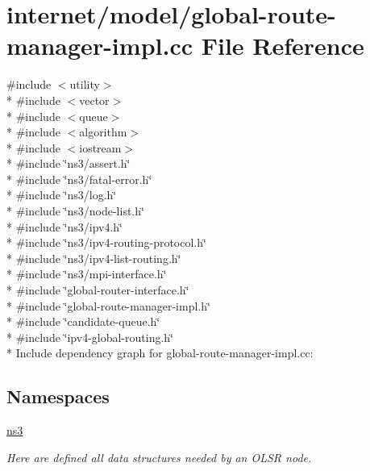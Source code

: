 \hypertarget{global-route-manager-impl_8cc}{}\section{internet/model/global-\/route-\/manager-\/impl.cc File Reference}
\label{global-route-manager-impl_8cc}
{\ttfamily \#include $<$utility$>$}\\*
{\ttfamily \#include $<$vector$>$}\\*
{\ttfamily \#include $<$queue$>$}\\*
{\ttfamily \#include $<$algorithm$>$}\\*
{\ttfamily \#include $<$iostream$>$}\\*
{\ttfamily \#include \char`\"{}ns3/assert.\+h\char`\"{}}\\*
{\ttfamily \#include \char`\"{}ns3/fatal-\/error.\+h\char`\"{}}\\*
{\ttfamily \#include \char`\"{}ns3/log.\+h\char`\"{}}\\*
{\ttfamily \#include \char`\"{}ns3/node-\/list.\+h\char`\"{}}\\*
{\ttfamily \#include \char`\"{}ns3/ipv4.\+h\char`\"{}}\\*
{\ttfamily \#include \char`\"{}ns3/ipv4-\/routing-\/protocol.\+h\char`\"{}}\\*
{\ttfamily \#include \char`\"{}ns3/ipv4-\/list-\/routing.\+h\char`\"{}}\\*
{\ttfamily \#include \char`\"{}ns3/mpi-\/interface.\+h\char`\"{}}\\*
{\ttfamily \#include \char`\"{}global-\/router-\/interface.\+h\char`\"{}}\\*
{\ttfamily \#include \char`\"{}global-\/route-\/manager-\/impl.\+h\char`\"{}}\\*
{\ttfamily \#include \char`\"{}candidate-\/queue.\+h\char`\"{}}\\*
{\ttfamily \#include \char`\"{}ipv4-\/global-\/routing.\+h\char`\"{}}\\*
Include dependency graph for global-\/route-\/manager-\/impl.cc\+:
\subsection*{Namespaces}
\begin{DoxyCompactItemize}
\item 
 \hyperlink{namespacens3}{ns3}
\begin{DoxyCompactList}\small\item\em Here are defined all data structures needed by an O\+L\+SR node. \end{DoxyCompactList}\end{DoxyCompactItemize}
